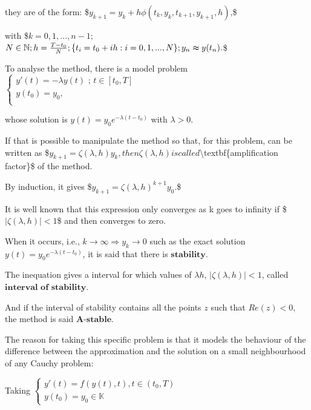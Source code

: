 \documentclass[letterpaper,10pt,english]{jupyterBook}
\begin{document}
\sphinxAtStartPar
they are of the form:
\$\(
y_{k+1} = y_{k} + h \phi (t_{k},y_{k},t_{k+1},y_{k+1},h) \text{,}
\)\$

\sphinxAtStartPar
with \$\(k = 0, 1, ..., n-1;\)\(
\)\(
N \in \mathbb{N}; h = \frac{T-t_0}{N}; \\
\{t_i = t_0 + ih : i = 0, 1, ..., N\}; \\ 
y_n \thickapprox y(t_n) .
\)\$

\sphinxAtStartPar
To analyse the method, there is a model problem
\(\begin{cases}
    y'(t) = - \lambda y(t) \text{ ; } t \in[t_0,T]\\ 
    y(t_0)=y_0,\\
\end{cases}\)

\sphinxAtStartPar
whose solution is \(y(t) = y_0 e^{-\lambda (t-t_0)}\)
with \(\lambda > 0.\)

\sphinxAtStartPar
If that is possible to manipulate the method so that, for this problem, can be written as
\$\(
y_{k+1} = \zeta(\lambda,h) y_k,
\)\(
then \)\(\zeta(\lambda,h)\)\( is called \)\textbackslash{}textbf\{amplification factor\}\$ of the method.

\sphinxAtStartPar
By induction, it gives
\$\(
y_{k+1} = \zeta(\lambda, h)^{k+1} y_0.
\)\$

\sphinxAtStartPar
It is well known that this expression only converges as k goes to infinity if
\$\(
|\zeta(\lambda, h)| < 1
\)\$
and then converges to zero.

\sphinxAtStartPar
When it occurs, i.e., \(k \rightarrow \infty \Rightarrow y_k \rightarrow 0\) such as the exact solution \(y(t) = y_0 e^{-\lambda (t-t_0)}\), it is said that there is \(\textbf{stability}\).

\sphinxAtStartPar
The inequation gives a interval for which values of \(\lambda h\), \(|\zeta(\lambda, h)|<1\), called \(\textbf{interval of stability}\).

\sphinxAtStartPar
And if the interval of stability contains all the points \(z\) such that \(Re(z) < 0\), the method is said \(\textbf{A-stable}\).

\sphinxAtStartPar
The reason for taking this specific problem is that it models the behaviour of the difference between the approximation and the solution on a small neighbourhood of any Cauchy problem:

\sphinxAtStartPar
Taking
\(\begin{cases}
    y'(t) = f(y(t), t), t \in (t_0, T) \\
    y(t_0) = y_0 \in \mathbb{K}
\end{cases}\)
\end{document}
